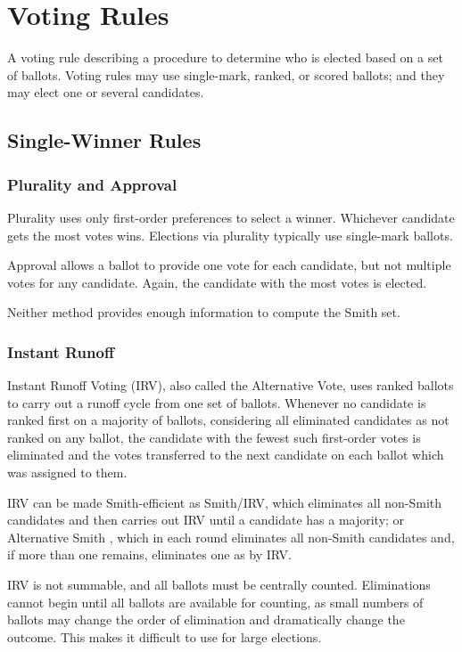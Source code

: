 
\chapter{Voting Rules}

A voting rule describing a procedure to determine who is elected based on a set of ballots.  Voting rules may use single-mark, ranked, or scored ballots; and they may elect one or several candidates.

\section{Single-Winner Rules}
\subsection{Plurality and Approval}
Plurality uses only first-order preferences to select a winner.  Whichever candidate gets the most votes wins.  Elections via plurality typically use single-mark ballots.

Approval allows a ballot to provide one vote for each candidate, but not multiple votes for any candidate.  Again, the candidate with the most votes is elected.

Neither method provides enough information to compute the Smith set.

\subsection{Instant Runoff}

Instant Runoff Voting (IRV), also called the Alternative Vote, uses ranked ballots to carry out a runoff cycle from one set of ballots.  Whenever no candidate is ranked first on a majority of ballots, considering all eliminated candidates as not ranked on any ballot, the candidate with the fewest such first-order votes is eliminated and the votes transferred to the next candidate on each ballot which was assigned to them.

IRV can be made Smith-efficient as Smith/IRV, which eliminates all non-Smith candidates and then carries out IRV until a candidate has a majority; or Alternative Smith \autocite{GreenArmytage2011}, which in each round eliminates all non-Smith candidates and, if more than one remains, eliminates one as by IRV.

IRV is not summable, and all ballots must be centrally counted.  Eliminations cannot begin until all ballots are available for counting, as small numbers of ballots may change the order of elimination and dramatically change the outcome.  This makes it difficult to use for large elections.

